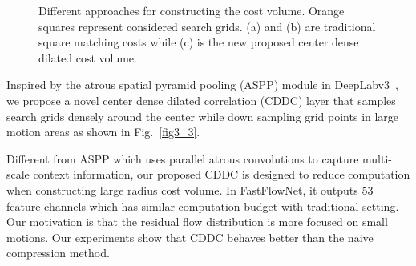 \documentclass[letterpaper, 10 pt, conference]{ieeeconf}
\begin{document}
\begin{figure}[t]
	\captionsetup[subfigure]{farskip=1pt}
	\centering
	\caption{Different approaches for constructing the cost volume. Orange squares represent considered search grids. (a) and (b) are traditional square matching costs while (c) is the new proposed center dense dilated cost volume.}
	\vspace{-5mm}
	\label{fig3}
\end{figure}

Inspired by the atrous spatial pyramid pooling (ASPP) module in DeepLabv3~\cite{chen2017rethinking}, we propose a novel center dense dilated correlation (CDDC) layer that samples search grids densely around the center while down sampling grid points in large motion areas as shown in Fig.~\ref{fig3_3}. 

Different from ASPP which uses parallel atrous convolutions to capture multi-scale context information, our proposed CDDC is designed to reduce computation when constructing large radius cost volume. In FastFlowNet, it outputs 53 feature channels which has similar computation budget with traditional  setting. Our motivation is that the residual flow distribution is more focused on small motions. Our experiments show that CDDC behaves better than the naive compression method.
\end{document}
